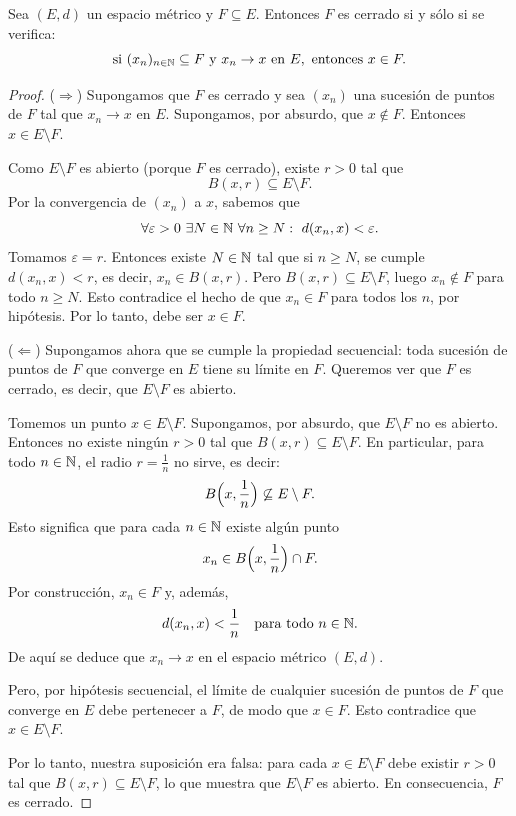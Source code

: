 \begin{prop}
Sea $(E,d)$ un espacio métrico y $F \subseteq E$.
Entonces $F$ es cerrado si y sólo si se verifica:
\[
\text{si } (x_n)_{n\in\mathbb{N}} \subseteq F \text{ y } x_n \to x \text{ en } E,
\text{ entonces } x \in F.
\]
\end{prop}

\begin{proof}
($\Rightarrow$) Supongamos que $F$ es cerrado y sea $(x_n)$ una sucesión
de puntos de $F$ tal que $x_n \to x$ en $E$. Supongamos, por absurdo,
que $x \notin F$. Entonces $x \in E \setminus F$.

Como $E \setminus F$ es abierto (porque $F$ es cerrado), existe $r>0$
tal que
\[
B(x,r) \subseteq E \setminus F.
\]
Por la convergencia de $(x_n)$ a $x$, sabemos que
\[
\forall \varepsilon > 0 \ \exists N \in \N \ \forall n \ge N:
\ d(x_n,x) < \varepsilon.
\]
Tomamos $\varepsilon = r$. Entonces existe $N \in \mathbb{N}$ tal que
si $n \ge N$, se cumple $d(x_n,x) < r$, es decir, $x_n \in B(x,r)$.
Pero $B(x,r) \subseteq E \setminus F$, luego $x_n \notin F$ para
todo $n \ge N$. Esto contradice el hecho de que $x_n \in F$ para
todos los $n$, por hipótesis. Por lo tanto, debe ser $x \in F$.

\medskip

($\Leftarrow$) Supongamos ahora que se cumple la propiedad secuencial:
toda sucesión de puntos de $F$ que converge en $E$ tiene su límite en $F$.
Queremos ver que $F$ es cerrado, es decir, que $E \setminus F$ es abierto.

Tomemos un punto $x \in E \setminus F$. Supongamos, por absurdo, que
$E \setminus F$ no es abierto. Entonces no existe ningún $r>0$ tal que
$B(x,r) \subseteq E \setminus F$. En particular, para todo $n \in \mathbb{N}$,
el radio $r = \tfrac{1}{n}$ no sirve, es decir:
\[
B\Bigl(x,\frac{1}{n}\Bigr) \not\subseteq E \setminus F.
\]
Esto significa que para cada $n \in \mathbb{N}$ existe algún punto
\[
x_n \in B\Bigl(x,\frac{1}{n}\Bigr) \cap F.
\]
Por construcción, $x_n \in F$ y, además,
\[
d(x_n,x) < \frac{1}{n} \quad \text{para todo } n \in \mathbb{N}.
\]
De aquí se deduce que $x_n \to x$ en el espacio métrico $(E,d)$.

Pero, por hipótesis secuencial, el límite de cualquier sucesión de puntos
de $F$ que converge en $E$ debe pertenecer a $F$, de modo que $x \in F$.
Esto contradice que $x \in E \setminus F$.

Por lo tanto, nuestra suposición era falsa: para cada $x \in E \setminus F$
debe existir $r>0$ tal que $B(x,r) \subseteq E \setminus F$, lo que muestra
que $E \setminus F$ es abierto. En consecuencia, $F$ es cerrado.
\end{proof}

